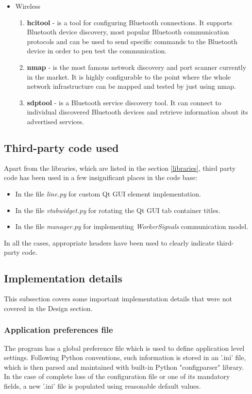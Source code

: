\begin{itemize}
		\item Wireless
		\begin{enumerate}[resume]
			\item \textbf{hcitool} - is a tool for configuring Bluetooth connections. It supports Bluetooth device discovery, most popular Bluetooth communication protocols and can be used to send specific commands to the Bluetooth device in order to pen test the communication.
			\item \textbf{nmap} - is the most famous network discovery and port scanner currently in the market. It is highly configurable to the point where the whole network infrastructure can be mapped and tested by just using nmap.
			\item \textbf{sdptool} - is a Bluetooth service discovery tool. It can connect to individual discovered Bluetooth devices and retrieve information about its advertised services.
		\end{enumerate}
	\end{itemize}
		

\subsection{Third-party code used}
	Apart from the libraries, which are listed in the section \ref{libraries}, third party code has been used in a few insignificant places in the code base:
	\begin{itemize}
		\item In the file \textit{line.py} for custom Qt GUI element implementation.
		\item In the file \textit{vtabwidget.py} for rotating the Qt GUI tab container titles.
		\item In the file \textit{manager.py} for implementing \textit{WorkerSignals} communication model.
	\end{itemize}
	In all the cases, appropriate headers have been used to clearly indicate third-party code.

\subsection{Implementation details}
	This subsection covers some important implementation details that were not covered in the Design section.
	
	\subsubsection{Application preferences file}
	The program has a global preference file which is used to define application level settings. Following Python conventions, such information is stored in an '.ini' file, which is then parsed and maintained with built-in Python "configparser" library. In the case of complete loss of the configuration file or one of its mandatory fields, a new '.ini' file is populated using reasonable default values.
			

